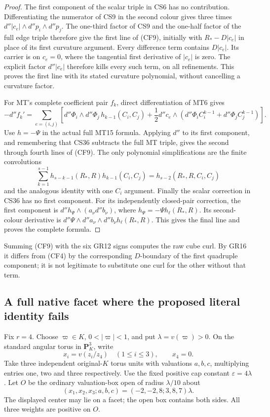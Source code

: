 \begin{proof}
The first component of the scalar triple in CS6 has no
contribution.  Differentiating the numerator of CS9 in the
second colour gives three times
$d''|c_e|\wedge d''p_i\wedge d''p_j$.
The one-third factor of CS9 and the one-half factor of the full
edge triple therefore give the first line of (CF9), initially
with $R_*-D|c_e|$ in place of its first curvature argument.
Every difference term contains $D|c_e|$.  Its carrier is on
$c_e=0$, where the tangential first derivative of $|c_e|$ is
zero.  The explicit factor $d''|c_e|$ therefore kills every
such term, on all refinements.  This proves the first line
with its stated curvature polynomial, without cancelling a
curvature factor.

For MT's complete coefficient pair $f_k$, direct differentiation
of MT6 gives
\[
 -d''f_k'=
 \sum_{e=(i,j)}\left[
 d''\Phi_i\wedge d''\Phi_j\,h_{k-1}(C_i,C_j)
 +\frac12d''c_e\wedge
    (d''\Phi_iC_i^{k-1}+d''\Phi_jC_j^{k-1})\right].
 \tag{CF10}
\]
Use $h=-\Psi$ in the actual full MT15 formula.  Applying $d''$
to its first component, and remembering that CS36 subtracts
the full MT triple, gives the second through fourth lines of
(CF9).  The only polynomial simplifications are the finite
convolutions
\[
 \sum_{k=1}^{s-1}h_{s-k-1}(R_*,R)h_{k-1}(C_i,C_j)
                       =h_{s-2}(R_*,R,C_i,C_j)
 \tag{CF11}
\]
and the analogous identity with one $C_i$ argument.
Finally the scalar correction in CS36 has no first component.
For its independently closed-pair correction, the first component
is $d''h_\Psi\wedge(a_\nu d''b_\nu)$, where
$h_\Psi=-\Psi h_\ell(R_*,R)$.  Its second-colour derivative is
$d''\Psi\wedge d''a_\nu\wedge d''b_\nu h_\ell(R_*,R)$.
This gives the final line and proves the complete formula.
\end{proof}

Summing (CF9) with the six GR12 signs computes the raw cube
curl.  By GR16 it differs from (CF4) by the corresponding
$D$-boundary of the first quadruple component; it is not
legitimate to substitute one curl for the other without that
term.

\subsection{A full native facet where the proposed literal identity fails}

Fix $r=4$.  Choose $\varpi\in K$, $0<|\varpi|<1$, and put
$\lambda=v(\varpi)>0$.  On the standard angular torus in
$\mathbf P^3_K$, write
\[
 x_i=v(z_i/z_4)\quad(1\le i\le3),\qquad x_4=0.
 \tag{CF12}
\]
Take three independent original-$K$ torus units with valuations
$a,b,c$, multiplying entries one, two and three respectively.
Use the fixed positive cap constant $\varepsilon=4\lambda$.
Let $O$ be the ordinary valuation-box open of radius
$\lambda/10$ about
\[
 (x_1,x_2,x_3;a,b,c)
                  =(-2,-2,8;3,8,7)\lambda.
 \tag{CF13}
\]
The displayed center may lie on a facet; the open box contains
both sides.  All three weights are positive on $O$.

